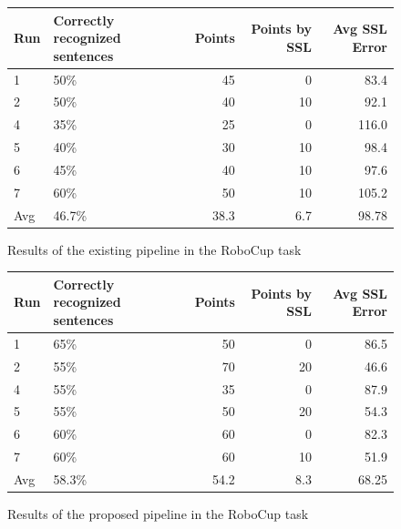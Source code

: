 \begin{figure}[]
	\begin{tabular}{ | l | p{3.5cm}  | r | r | r |}
		\hline
		Run & Correctly recognized sentences & Points & Points by SSL & Avg SSL Error \\ \hline
		1 & 50\% & 45 & 0 & 83.4\\ \hline
		2 & 50\% & 40 & 10 & 92.1\\ \hline
		4 & 35\% & 25 &  0 & 116.0\\ \hline
		5 & 40\% & 30 & 10 & 98.4\\ \hline
		6 & 45\% & 40 & 10 & 97.6\\ \hline
		7 & 60\% & 50 & 10 & 105.2\\ \hhline{|=|=|=|=|=|}
		Avg & 46.7\% & 38.3 & 6.7 & 98.78 \\
		\hline
	\end{tabular}
	\caption{Results of the existing pipeline in the RoboCup task}
	\label{table:eval_task_results_old}
\end{figure}

\begin{figure}[ht]
	\begin{tabular}{ | l | p{3.5cm} | r | r | r |}
		\hline
		Run & Correctly recognized sentences & Points & Points by SSL & Avg SSL Error \\ \hline
		1 & 65\% & 50 &  0 & 86.5\\ \hline
		2 & 55\% & 70 & 20 & 46.6\\ \hline
		4 & 55\% & 35 &  0 & 87.9\\ \hline
		5 & 55\% & 50 & 20 & 54.3\\ \hline
		6 & 60\% & 60 &  0 & 82.3\\ \hline
		7 & 60\% & 60 & 10 & 51.9\\ \hhline{|=|=|=|=|=|}
		Avg & 58.3\% & 54.2 & 8.3 & 68.25\\
		\hline
	\end{tabular}
	\caption{Results of the proposed pipeline in the RoboCup task}
	\label{table:eval_task_results_new}
\end{figure}


